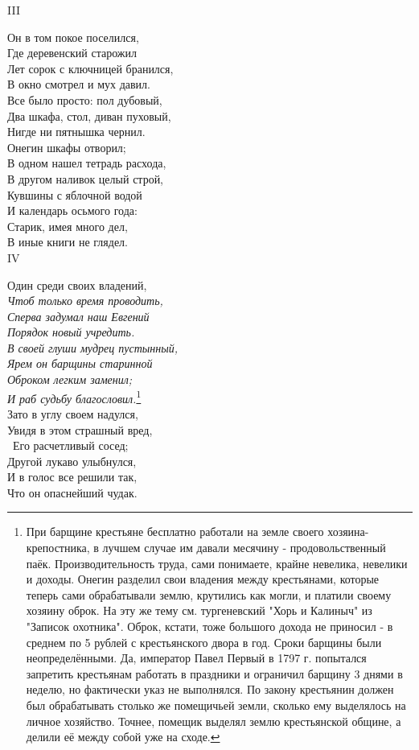 III

Он в том покое поселился,\\
Где деревенский старожил\\
Лет сорок с ключницей бранился,\\
В окно смотрел и мух давил.\\
Все было просто: пол дубовый,\\
Два шкафа, стол, диван пуховый,\\
Нигде ни пятнышка чернил.\\
Онегин шкафы отворил;\\
В одном нашел тетрадь расхода,\\
В другом наливок целый строй,\\
Кувшины с яблочной водой\\
И календарь осьмого года:\\
Старик, имея много дел,\\
В иные книги не глядел.\\

IV

Один среди своих владений,\\
\textit{Чтоб только время проводить,\\
Сперва задумал наш Евгений\\
Порядок новый учредить.\\
В своей глуши мудрец пустынный,\\
Ярем он барщины старинной\\
Оброком легким заменил;\\
И раб судьбу благословил.}\footnote{При барщине крестьяне бесплатно работали на земле своего хозяина-крепостника, в лучшем случае им давали месячину - продовольственный паёк. Производительность труда, сами понимаете, крайне невелика, невелики и доходы. Онегин разделил свои владения между крестьянами, которые теперь сами обрабатывали землю, крутились как могли, и платили своему хозяину оброк. На эту же тему см. тургеневский "Хорь и Калиныч" из "Записок охотника". Оброк, кстати, тоже большого дохода не приносил - в среднем по 5 рублей с крестьянского двора в год. 
Сроки барщины были неопределёнными. Да, император Павел Первый в 1797 г. попытался запретить крестьянам работать в праздники и ограничил барщину 3 днями в неделю, но фактически указ не выполнялся. По закону крестьянин должен был обрабатывать столько же помещичьей земли, сколько ему выделялось на личное хозяйство. Точнее, помещик выделял землю крестьянской общине, а делили её между собой уже на сходе. }\\
Зато в углу своем надулся,\\
Увидя в этом страшный вред,\\\
Его расчетливый сосед;\\
Другой лукаво улыбнулся,\\
И в голос все решили так,\\
Что он опаснейший чудак.\\

